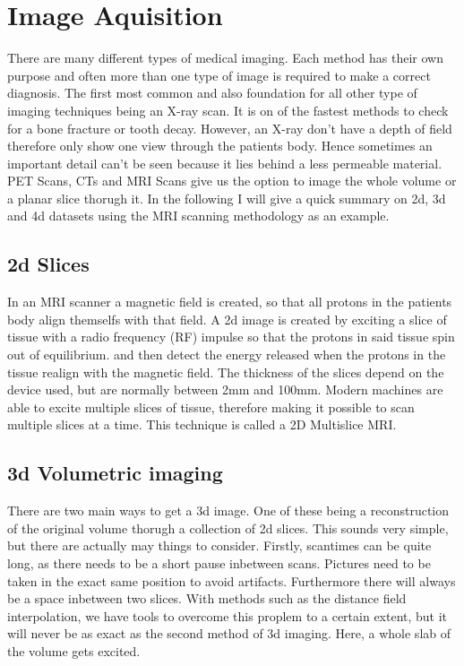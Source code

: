   \section{Image Aquisition}
 \label{Image Aquisition}
 There are many different types of medical imaging. Each method has their own purpose and often more than one type of image is required to make a correct diagnosis. The first most common and also foundation for all other type of imaging techniques being an X-ray scan. It is on of the fastest methods to check for a bone fracture or tooth decay. However,  an X-ray don't have a depth of field therefore only show one view through the patients body. Hence sometimes an important detail can't be seen because it lies behind a less permeable material. PET Scans, CTs and MRI Scans give us the option to image the whole volume or a planar slice thorugh it. In the following I will give a quick summary on 2d, 3d and 4d datasets using the MRI scanning methodology as an example.

 \subsection{2d Slices}
  \label{2d Slice}
 In an MRI scanner a magnetic field is created, so that all protons in the patients body align themselfs with that field.
A 2d image is created by exciting a slice of tissue with a radio frequency (RF) impulse so that the protons in said tissue spin out of equilibrium.  and then detect the energy released when the protons in the tissue realign with the magnetic field.
\cite{MagneticResonanceImaging}
The thickness of the slices depend on the device used, but are normally between 2mm and 100mm.
\cite{johnson2DMultislice3D1999}
Modern machines are able to excite multiple slices of tissue, therefore making it possible to scan multiple slices at a time. This technique is called a 2D Multislice MRI.
\cite{vangeunsBasicPrinciplesMagnetic1999}

  \subsection{3d Volumetric imaging}
  \label{3d Volumetric imaging}
  There are two main ways to get a 3d image. One of these being a reconstruction of the original volume thorugh a collection of 2d slices. This sounds very simple, but there are actually may things to consider. Firstly, scantimes can be quite long, as there needs to be a short pause inbetween scans. Pictures need to be taken in the exact same position to avoid artifacts. Furthermore there will always be a space inbetween two slices. With methods such as the distance field interpolation, we have tools to overcome this proplem to a certain extent, but it will never be as exact as the second method of 3d imaging.
  \cite{vangeunsBasicPrinciplesMagnetic1999}
  Here, a whole slab of the volume gets excited.


